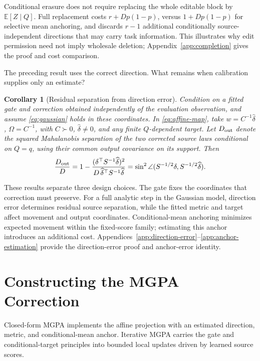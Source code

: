 \documentclass{article}
\theoremstyle{plain}
\newtheorem{corollary}[theorem]{Corollary}
\theoremstyle{definition}
\newcommand{\E}{\mathbb E}
\begin{document}
Conditional erasure does not require replacing the whole editable block by
$\E[Z\mid Q]$. Full replacement costs $r+Dp(1-p)$, versus $1+Dp(1-p)$
for selective mean anchoring, and discards $r-1$ additional conditionally
source-independent directions that may carry task information. This
illustrates why edit permission need not imply wholesale deletion;
Appendix~\ref{app:completion} gives the proof and cost comparison.

The preceding result uses the correct direction. What remains when
calibration supplies only an estimate?
\begin{corollary}[Residual separation from direction error]
\label{cor:direction-error}
Condition on a fitted gate and correction obtained independently of the
evaluation observation, and assume \eqref{eq:gaussian} holds in these
coordinates. In \eqref{eq:affine-map}, take
$w=C^{-1}\widehat\delta$, $\Omega=C^{-1}$, with
$C\succ0$, $\widehat\delta\ne0$, and any finite $Q$-dependent target.
Let $D_{\rm out}$ denote the squared Mahalanobis separation of the two
corrected source laws conditional on $Q=q$, using their common output
covariance on its support. Then
\begin{equation}
 \frac{D_{\rm out}}{D}
 =1-\frac{(\delta^\top S^{-1}\widehat\delta)^2}
 {D\,\widehat\delta^\top S^{-1}\widehat\delta}
 =\sin^2\angle(S^{-1/2}\delta,S^{-1/2}\widehat\delta).
 \label{eq:direction-residual}
\end{equation}
\end{corollary}
These results separate three design choices. The gate fixes the coordinates
that correction must preserve. For a full analytic step in the Gaussian
model, direction error determines residual source separation, while the
fitted metric and target affect movement and output coordinates.
Conditional-mean anchoring minimizes expected movement within the fixed-score
family; estimating this anchor introduces an additional cost.
Appendices~\ref{app:direction-error}--\ref{app:anchor-estimation} provide the
direction-error proof and anchor-error identity.

\section{Constructing the MGPA Correction}
\label{sec:method}
\label{sec:algorithm}
Closed-form MGPA implements the affine projection with an estimated
direction, metric, and conditional-mean anchor. Iterative MGPA carries the
gate and conditional-target principles into bounded local updates driven
by learned source scores.
\end{document}
